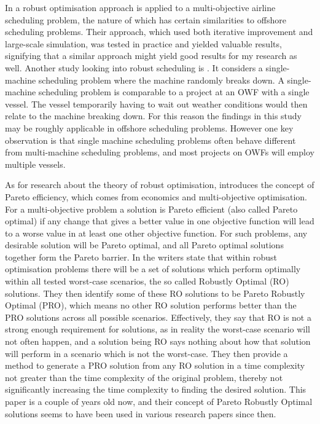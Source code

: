 \documentclass[a4paper,12pt]{article}
\begin{document}
In \cite{burke2010multi} a robust optimisation approach is applied to a multi-objective airline scheduling problem, the nature of which has certain similarities to offshore scheduling problems. Their approach, which used both iterative improvement and large-scale simulation, was tested in practice and yielded valuable results, signifying that a similar approach might yield good results for my research as well. 
Another study looking into robust scheduling is \cite{goren2008robustness}. It considers a single-machine scheduling problem where the machine randomly breaks down. A single-machine scheduling problem is comparable to a project at an OWF with a single vessel. The vessel temporarily having to wait out weather conditions would then relate to the machine breaking down. For this reason the findings in this study may be roughly applicable in offshore scheduling problems. However one key observation is that single machine scheduling problems often behave different from multi-machine scheduling problems, and most projects on OWFs will employ multiple vessels. 

As for research about the theory of robust optimisation, \cite{iancu2013pareto} introduces the concept of Pareto efficiency, which comes from economics and multi-objective optimisation. For a multi-objective problem a solution is Pareto efficient (also called Pareto optimal) if any change that gives a better value in one objective function will lead to a worse value in at least one other objective function. For such problems, any desirable solution will be Pareto optimal, and all Pareto optimal solutions together form the Pareto barrier. In \cite{iancu2013pareto} the writers state that within robust optimisation problems there will be a set of solutions which perform optimally within all tested worst-case scenarios, the so called Robustly Optimal (RO) solutions. They then identify some of these RO solutions to be Pareto Robustly Optimal (PRO), which means no other RO solution performs better than the PRO solutions across all possible scenarios. Effectively, they say that RO is not a strong enough requirement for solutions, as in reality the worst-case scenario will not often happen, and a solution being RO says nothing about how that solution will perform in a scenario which is not the worst-case. They then provide a method to generate a PRO solution from any RO solution in a time complexity not greater than the time complexity of the original problem, thereby not significantly increasing the time complexity to finding the desired solution. This paper is a couple of years old now, and their concept of Pareto Robustly Optimal solutions seems to have been used in various research papers since then. 
\end{document}
